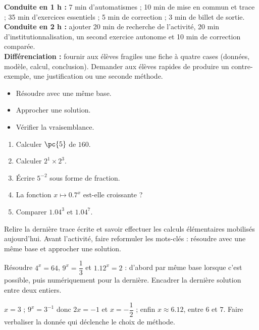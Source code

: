 \ifmxteacher
\begin{method}
\textbf{Conduite en 1 h :} 7 min d'automatismes ; 10 min de mise en commun et trace ; 35 min d'exercices essentiels ; 5 min de correction ; 3 min de billet de sortie.\\
\textbf{Conduite en 2 h :} ajouter 20 min de recherche de l'activité, 20 min d'institutionnalisation, un second exercice autonome et 10 min de correction comparée.\\
\textbf{Différenciation :} fournir aux élèves fragiles une fiche à quatre cases (données, modèle, calcul, conclusion). Demander aux élèves rapides de produire un contre-exemple, une justification ou une seconde méthode.
\end{method}
\fi
{}
\begin{objectives}\begin{itemize}\item Résoudre avec une même base.\item Approcher une solution.\item Vérifier la vraisemblance.\end{itemize}\end{objectives}
\begin{fluency}\begin{enumerate}\item Calculer $\pc{5}$ de $160$. \item Calculer $2^1\times2^3$. \item Écrire $5^{-2}$ sous forme de fraction. \item La fonction $x\mapsto\num{0,7}^x$ est-elle croissante ? \item Comparer $\num{1,04}^3$ et $\num{1,04}^7$. \end{enumerate}\end{fluency}
\begin{prerequisites}Relire la dernière trace écrite et savoir effectuer les calculs élémentaires mobilisés aujourd'hui. Avant l'activité, faire reformuler les mots-clés : résoudre avec une même base et approcher une solution.\end{prerequisites}

\begin{activity}
Résoudre $4^x=64$, $9^x=\dfrac13$ et $\num{1,12}^x=2$ : d'abord par même base lorsque c'est possible, puis numériquement pour la dernière. Encadrer la dernière solution entre deux entiers.

\end{activity}
\begin{solution}$x=3$ ; $9^x=3^{-1}$ donc $2x=-1$ et $x=-\dfrac12$ ; enfin $x\approx\num{6,12}$, entre $6$ et $7$. Faire verbaliser la donnée qui déclenche le choix de méthode.\end{solution}

